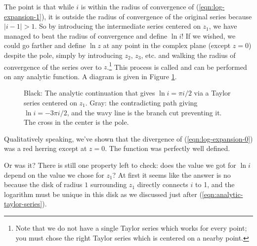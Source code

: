 The point is that while $i$ is within the radius of convergence of (\ref{eqn:log-expansion-1}), it is outside the radius of convergence of the original series because $|i-1|>1$. So by introducing the intermediate series centered on $z_1$, we have managed to beat the radius of convergence and define $\ln i$! If we wished, we could go farther and define $\ln z$ at any point in the complex plane (except $z=0$) despite the pole, simply by introducing $z_2$, $z_3$, etc. and walking the radius of convergence of the series over to $z$.\footnote{Note that we do not have a single Taylor series which works for every point; you must chose the right Taylor series which is centered on a nearby point.} This process is called  and can be performed on any analytic function. A diagram is given in Figure \ref{fig:ln-analytic-continuation}.

\begin{figure}
  \centering
  \caption{Black: The analytic continuation that gives $\ln i = \pi i / 2$ via a Taylor series centered on $z_1$. Gray: the contradicting path giving $\ln i = -3\pi i / 2$, and the wavy line is the branch cut preventing it. The cross in the center is the pole.}
  \label{fig:ln-analytic-continuation}
\end{figure}

Qualitatively speaking, we've shown that the divergence of (\ref{eqn:log-expansion-0}) was a red herring except at $z=0$. The function was perfectly well defined.

Or was it? There is still one property left to check: does the value we got for $\ln i$ depend on the value we chose for $z_1$? At first it seems like the answer is no because the disk of radius $1$ surrounding $z_1$ directly connects $i$ to 1, and the logarithm must be unique in this disk as we discussed just after (\ref{eqn:analytic-taylor-series}).

